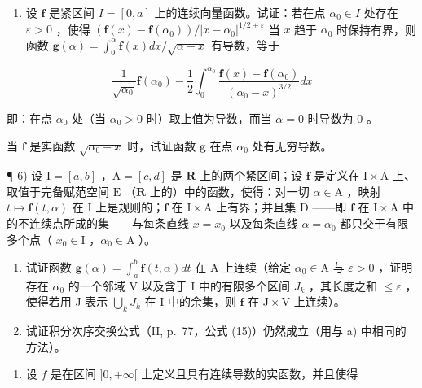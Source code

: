 \begin{enumerate}
\def\labelenumi{\arabic{enumi})}
\setcounter{enumi}{4}
\tightlist
\item
  设 \(\mathbf{f}\) 是紧区间 \(I = [0, a]\) 上的连续向量函数。试证：若在点 \(\alpha_0 \in I\) 处存在 \(\varepsilon > 0\) ，使得 \((\mathbf{f}(x) - \mathbf{f}(\alpha_0)) / |x - \alpha_0|^{1/2 + \varepsilon}\) 当 \(x\) 趋于 \(\alpha_0\) 时保持有界，则函数 \(\mathbf{g}(\alpha) = \int_0^\alpha \mathbf{f}(x) dx / \sqrt{\alpha - x}\) 有导数，等于
\end{enumerate}

\[
\frac {1}{\sqrt {\alpha_ {0}}} \mathbf {f} (\alpha_ {0}) - \frac {1}{2} \int_ {0} ^ {\alpha_ {0}} \frac {\mathbf {f} (x) - \mathbf {f} (\alpha_ {0})}{(\alpha_ {0} - x) ^ {3 / 2}} d x
\]

即：在点 \(\alpha_0\) 处（当 \(\alpha_0 > 0\) 时）取上值为导数，而当 \(\alpha = 0\) 时导数为 0 。

当 \(\mathbf{f}\) 是实函数 \(\sqrt{\alpha_0 - x}\) 时，试证函数 \(\mathbf{g}\) 在点 \(\alpha_0\) 处有无穷导数。

¶ 6) 设 \(\mathrm{I} = [a, b]\) ，\(\mathrm{A} = [c, d]\) 是 \(\mathbf{R}\) 上的两个紧区间；设 \(\mathbf{f}\) 是定义在 \(\mathrm{I} \times \mathrm{A}\) 上、取值于完备赋范空间 \(\mathrm{E}\) （\(\mathbf{R}\) 上的）中的函数，使得：对一切 \(\alpha \in \mathrm{A}\) ，映射 \(t \mapsto \mathbf{f}(t, \alpha)\) 在 \(\mathrm{I}\) 上是规则的；\(\mathbf{f}\) 在 \(\mathrm{I} \times \mathrm{A}\) 上有界；并且集 \(\mathrm{D}\) ——即 \(\mathbf{f}\) 在 \(\mathrm{I} \times \mathrm{A}\) 中的不连续点所成的集——与每条直线 \(x = x_0\) 以及每条直线 \(\alpha = \alpha_0\) 都只交于有限多个点（ \(x_0 \in \mathrm{I}\) ，\(\alpha_0 \in \mathrm{A}\) ）。

\begin{enumerate}
\def\labelenumi{\alph{enumi})}
\item
  试证函数 \(\mathbf{g}(\alpha) = \int_{a}^{b} \mathbf{f}(t, \alpha) dt\) 在 A 上连续（给定 \(\alpha_0 \in \mathrm{A}\) 与 \(\varepsilon > 0\) ，证明存在 \(\alpha_0\) 的一个邻域 V 以及含于 I 中的有限多个区间 \(J_k\) ，其长度之和 \(\leqslant \varepsilon\) ，使得若用 J 表示 \(\bigcup_{k} J_k\) 在 I 中的余集，则 \(\mathbf{f}\) 在 \(\mathrm{J} \times \mathrm{V}\) 上连续）。
\item
  试证积分次序交换公式（II, p.~77，公式 (15)）仍然成立（用与 a) 中相同的方法）。
\end{enumerate}

\begin{enumerate}
\def\labelenumi{\arabic{enumi})}
\setcounter{enumi}{6}
\tightlist
\item
  设 \(f\) 是在区间 \(]0, +\infty[\) 上定义且具有连续导数的实函数，并且使得
\end{enumerate}

